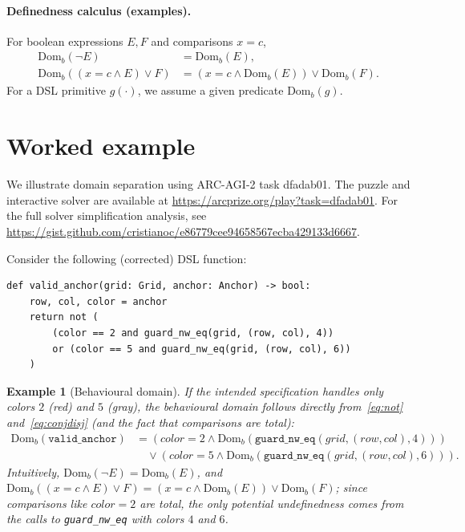 \documentclass[11pt]{article}
\newtheorem{example}{Example}
\newcommand{\Domb}{\mathrm{Dom}_b}
\begin{document}
\paragraph{Definedness calculus (examples).}
For boolean expressions $E,F$ and comparisons $x{=}c$,
\begin{align}
\Domb(\lnot E) &= \Domb(E), \label{eq:not}\\
\Domb((x{=}c \land E) \lor F) &= (x{=}c \land \Domb(E)) \lor \Domb(F). \label{eq:conjdisj}
\end{align}
For a DSL primitive $g(\cdot)$, we assume a given predicate $\Domb(g)$.

\section{Worked example}

We illustrate domain separation using ARC-AGI-2 task dfadab01. The puzzle and interactive solver are available at \url{https://arcprize.org/play?task=dfadab01}. For the full solver simplification analysis, see \url{https://gist.github.com/cristianoc/e86779cee94658567ecba429133d6667}.

Consider the following (corrected) DSL function:
\begin{lstlisting}
def valid_anchor(grid: Grid, anchor: Anchor) -> bool:
    row, col, color = anchor
    return not (
        (color == 2 and guard_nw_eq(grid, (row, col), 4))
        or (color == 5 and guard_nw_eq(grid, (row, col), 6))
    )
\end{lstlisting}

\begin{example}[Behavioural domain]
If the intended specification handles only colors $2$ (red) and $5$ (gray), the behavioural domain follows directly from~\eqref{eq:not} and~\eqref{eq:conjdisj} (and the fact that comparisons are total):
\[
\begin{aligned}
\Domb(\texttt{valid\_anchor})
&= (color{=}2 \land \Domb(\texttt{guard\_nw\_eq}(grid,(row,col),4))) \\
&\quad \lor (color{=}5 \land \Domb(\texttt{guard\_nw\_eq}(grid,(row,col),6))).
\end{aligned}
\]
Intuitively, $\Domb(\lnot E)=\Domb(E)$, and $\Domb((x{=}c \land E)\lor F)=(x{=}c\land \Domb(E))\lor \Domb(F)$; since comparisons like $color{=}2$ are total, the only potential undefinedness comes from the calls to \texttt{guard\_nw\_eq} with colors $4$ and $6$.
\end{example}
\end{document}
